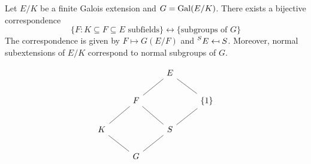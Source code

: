 
\begin{theorem}[Galois]
    Let $E/K$ be a finite Galois extension and $G=\operatorname{Gal}(E/K)$. 
    There exists a bijective correspondence
    \[
    \{F:K\subseteq F\subseteq E\text{ subfields}\}\leftrightarrow
    \{\text{subgroups of $G$}\}
    \]
    The correspondence is given by $F\mapsto G(E/F)$ and 
    $\prescript{S}{}{E}\mapsfrom S$. Moreover, 
    normal subextensions of $E/K$ correspond 
    to normal subgroups of $G$. 
\end{theorem}

\[
\begin{tikzcd}
	&& E \\
	& F && {\{1\}} \\
	K && S \\
	& G
	\arrow[no head, from=1-3, to=2-2]
	\arrow[no head, from=2-2, to=3-1]
	\arrow[no head, from=3-1, to=4-2]
	\arrow[no head, from=4-2, to=3-3]
	\arrow[no head, from=2-2, to=3-3]
	\arrow[no head, from=1-3, to=2-4]
	\arrow[no head, from=2-4, to=3-3]
\end{tikzcd}
\]

